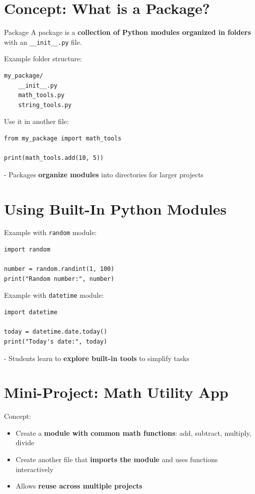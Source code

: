 \section{Concept: What is a Package?}

\begin{definition}{Package}
A package is a \textbf{collection of Python modules organized in folders} with an \texttt{\_\_init\_\_.py} file.
\end{definition}

Example folder structure:

\begin{verbatim}
my_package/
    __init__.py
    math_tools.py
    string_tools.py
\end{verbatim}

Use it in another file:

\begin{verbatim}
from my_package import math_tools

print(math_tools.add(10, 5))
\end{verbatim}

- Packages \textbf{organize modules} into directories for larger projects  

\section{Using Built-In Python Modules}

Example with \texttt{random} module:

\begin{verbatim}
import random

number = random.randint(1, 100)
print("Random number:", number)
\end{verbatim}

Example with \texttt{datetime} module:

\begin{verbatim}
import datetime

today = datetime.date.today()
print("Today's date:", today)
\end{verbatim}

- Students learn to \textbf{explore built-in tools} to simplify tasks  

\section{Mini-Project: Math Utility App}

Concept:

\begin{itemize}
    \item Create a \textbf{module with common math functions}: add, subtract, multiply, divide  
    \item Create another file that \textbf{imports the module} and uses functions interactively  
    \item Allows \textbf{reuse across multiple projects}  
\end{itemize}

